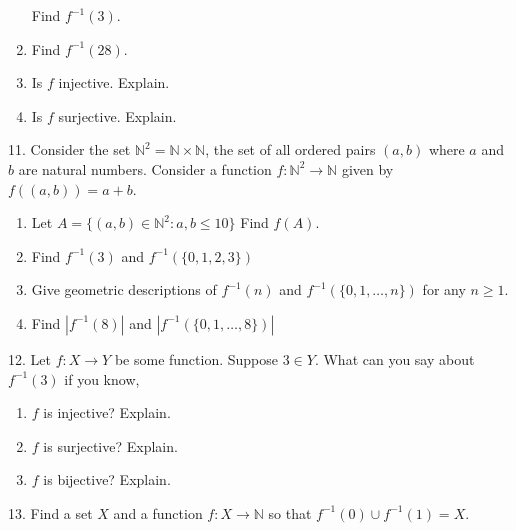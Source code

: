 \documentclass[10pt,]{book}
\theoremstyle{plain}
\theoremstyle{definition}
\theoremstyle{definition}
\numberwithin{equation}{chapter}
\newcommand{\N}{\mathbb N}
\newcommand{\inv}{^{-1}}
\newcommand{\st}{:}
\newcommand{\card}[1]{\left| #1 \right|}
\begin{document}
\begin{exerciselist}
\begin{enumerate}[label=(\alph*)]
Find \(f\inv(3)\).%
\item\hypertarget{li-480}{}\hypertarget{p-738}{}%
Find \(f\inv(28)\).%
\item\hypertarget{li-481}{}\hypertarget{p-739}{}%
Is \(f\) injective. Explain.%
\item\hypertarget{li-482}{}\hypertarget{p-740}{}%
Is \(f\) surjective. Explain.%
\end{enumerate}
%
\par\smallskip
\item[11.]\hypertarget{exercise-57}{}\hypertarget{p-746}{}%
Consider the set \(\N^2 = \N \times \N\), the set of all ordered pairs \((a,b)\) where \(a\) and \(b\) are natural numbers.  Consider a function \(f: \N^2 \to \N\) given by \(f((a,b)) =a+b\). \leavevmode%
\begin{enumerate}[label=(\alph*)]
\item\hypertarget{li-489}{}\hypertarget{p-747}{}%
Let \(A = \{(a,b) \in \N^2 \st a, b \le 10\}\) Find \(f(A)\).%
\item\hypertarget{li-490}{}\hypertarget{p-748}{}%
Find \(f\inv(3)\) and \(f\inv(\{0,1,2,3\})\)%
\item\hypertarget{li-491}{}\hypertarget{p-749}{}%
Give geometric descriptions of \(f\inv(n)\) and \(f\inv(\{0, 1, \ldots, n\})\) for any \(n \ge 1\).%
\item\hypertarget{li-492}{}\hypertarget{p-750}{}%
Find \(\card{f\inv(8)}\) and \(\card{f\inv(\{0,1, \ldots, 8\})}\)%
\end{enumerate}
%
\par\smallskip
\item[12.]\hypertarget{exercise-58}{}\hypertarget{p-756}{}%
Let \(f:X \to Y\) be some function. Suppose \(3 \in Y\). What can you say about \(f\inv(3)\) if you know, \leavevmode%
\begin{enumerate}[label=(\alph*)]
\item\hypertarget{li-497}{}\hypertarget{p-757}{}%
\(f\) is injective? Explain.%
\item\hypertarget{li-498}{}\hypertarget{p-758}{}%
\(f\) is surjective? Explain.%
\item\hypertarget{li-499}{}\hypertarget{p-759}{}%
\(f\) is bijective? Explain.%
\end{enumerate}
%
\par\smallskip
\item[13.]\hypertarget{exercise-59}{}\hypertarget{p-764}{}%
Find a set \(X\) and a function \(f:X \to \N\) so that \(f\inv(0) \cup f\inv(1) = X\).%
\par\smallskip

\end{exerciselist}
\end{document}
